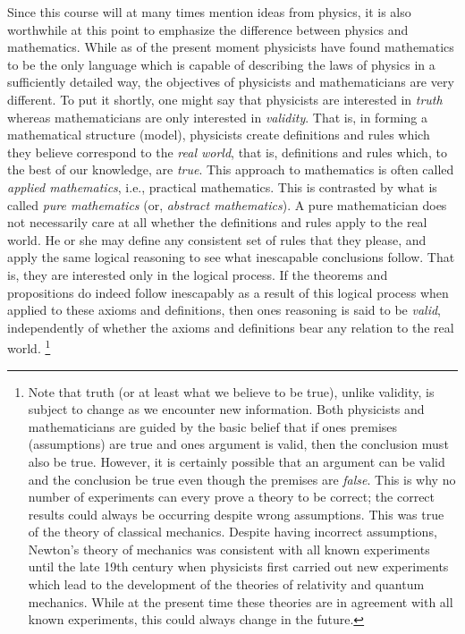 \documentclass[12pt,letterpaper,reqno]{article}
\numberwithin{equation}{section}
\newcommand{\ti}[1]{\textit{#1}}
\begin{document}
Since this course will at many times mention ideas from physics, it is also worthwhile at this point to emphasize the difference between physics and mathematics. While as of the present moment physicists have found mathematics to be the only language which is capable of describing the laws of physics in a sufficiently detailed way, the objectives of physicists and mathematicians are very different. To put it shortly, one might say that physicists are interested in \ti{truth} whereas mathematicians are only interested in \ti{validity}. That is, in forming a mathematical structure (model), physicists create definitions and rules which they believe correspond to the \ti{real world}, that is, definitions and rules which, to the best of our knowledge, are \ti{true}. This approach to mathematics is often called \ti{applied mathematics}, i.e., practical mathematics. This is contrasted by what is called \ti{pure mathematics} (or, \ti{abstract mathematics}). A pure mathematician does not necessarily care at all whether the definitions and rules apply to the real world. He or she may define any consistent set of rules that they please, and apply the same logical reasoning to see what inescapable conclusions follow. That is, they are interested only in the logical process. If the theorems and propositions do indeed follow inescapably as a result of this logical process when applied to these axioms and definitions, then ones reasoning is said to be \ti{valid}, independently of whether the axioms and definitions bear any relation to the real world. \footnote{Note that truth (or at least what we believe to be true), unlike validity, is subject to change as we encounter new information. Both physicists and mathematicians are guided by the basic belief that if ones premises (assumptions) are true and ones argument is valid, then the conclusion must also be true. However, it is certainly possible that an argument can be valid and the conclusion be true even though the premises are \ti{false}. This is why no number of experiments can every prove a theory to be correct; the correct results could always be occurring despite wrong assumptions. This was true of the theory of classical mechanics. Despite having incorrect assumptions, Newton's theory of mechanics was consistent with all known experiments until the late 19th century when physicists first carried out new experiments which lead to the development of the theories of relativity and quantum mechanics. While at the present time these theories are in agreement with all known experiments, this could always change in the future.}
\end{document}
